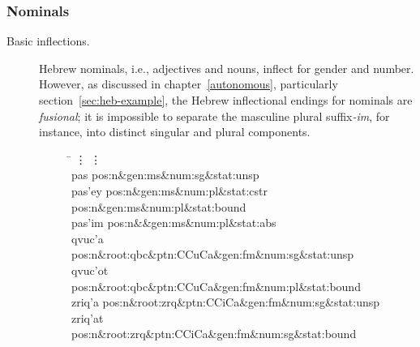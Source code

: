 {\subsubsection{Nominals}
\begin{description}
\item[Basic inflections.] Hebrew nominals, i.e., adjectives and nouns, 
inflect for gender and number. However, as discussed in chapter~\ref{autonomous}, 
particularly section~\ref{sec:heb-example}, the Hebrew inflectional endings 
for nominals are \emph{fusional}; it is impossible to separate the masculine plural suffix\textit{-im}, for instance, into 
distinct singular and plural components.
\begin{figure}[t]
\begin{mdframed}
\begin{tabbing}
\hspace{1in} \= \hspace{5.5in} \kill
\vdots \> \vdots \\
pas \> pos:n\&gen:ms\&num:sg\&stat:unsp\\
pas\a'{e}y \> pos:n\&gen:ms\&num:pl\&stat:cstr pos:n\&gen:ms\&num:pl\&stat:bound\\
pas\a'{i}m \> pos:n\&\&gen:ms\&num:pl\&stat:abs\\
qvuc\a'{a} \> pos:n\&root:qbc\&ptn:CCuCa\&gen:fm\&num:sg\&stat:unsp\\
qvuc\a'{o}t \> pos:n\&root:qbc\&ptn:CCuCa\&gen:fm\&num:pl\&stat:bound \\
zriq\a'{a} \> pos:n\&root:zrq\&ptn:CCiCa\&gen:fm\&num:sg\&stat:unsp \\
zriq\a'{a}t	 \> pos:n\&root:zrq\&ptn:CCiCa\&gen:fm\&num:sg\&stat:bound \\

\end{tabbing}
\end{mdframed}
\end{figure}
\end{description}}
